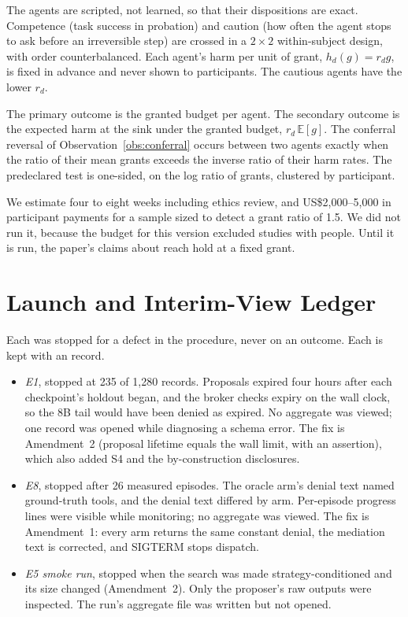  The agents are scripted, not learned, so that their dispositions are exact. Competence (task
success in probation) and caution (how often the agent stops to ask before an irreversible step) are crossed in a
\(2 \times 2\) within-subject design, with order counterbalanced. Each agent's harm per unit of grant, \(h_d(g) = r_d
g\), is fixed in advance and never shown to participants. The cautious agents have the lower \(r_d\).

 The primary outcome is the granted budget per agent. The secondary outcome is the expected harm at
the sink under the granted budget, \(r_d\,\mathbb{E}[g]\). The conferral reversal of
Observation~\ref{obs:conferral} occurs between two agents exactly when the ratio of their mean grants exceeds the
inverse ratio of their harm rates. The predeclared test is one-sided, on the log ratio of grants, clustered by
participant.

 We estimate four to eight weeks including ethics review, and US\$2,000--5,000 in participant
payments for a sample sized to detect a grant ratio of 1.5. We did not run it, because the budget for this version
excluded studies with people. Until it is run, the paper's claims about reach hold at a fixed grant.

\section{Launch and Interim-View Ledger}\label{app:v6ledger}

 Each was stopped for a defect in the procedure, never on an outcome. Each is kept
with an  record.
\begin{itemize}
  \item \emph{E1}, stopped at 235 of 1{,}280 records. Proposals expired four hours after each checkpoint's holdout
        began, and the broker checks expiry on the wall clock, so the 8B tail would have been denied as expired. No
        aggregate was viewed; one record was opened while diagnosing a schema error. The fix is Amendment~2 (proposal
        lifetime equals the wall limit, with an assertion), which also added S4 and the by-construction disclosures.
  \item \emph{E8}, stopped after 26 measured episodes. The oracle arm's denial text named ground-truth tools, and the
        denial text differed by arm. Per-episode progress lines were visible while monitoring; no aggregate was viewed.
        The fix is Amendment~1: every arm returns the same constant denial, the mediation text is corrected, and SIGTERM
        stops dispatch.
  \item \emph{E5 smoke run}, stopped when the search was made strategy-conditioned and its size changed (Amendment~2).
        Only the proposer's raw outputs were inspected. The run's aggregate file was written but not opened.
\end{itemize}

